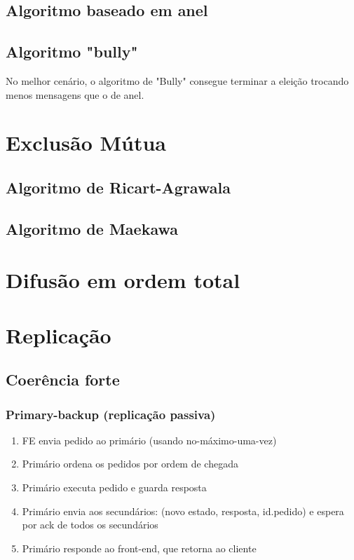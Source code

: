 \documentclass[12pt]{article}
\begin{document}
\subsection{Algoritmo baseado em anel}



\subsection{Algoritmo "bully"}



No melhor cenário, o algoritmo de "Bully" consegue terminar a eleição trocando menos mensagens que o de anel.

\section{Exclusão Mútua}

\subsection{Algoritmo de Ricart-Agrawala}

\subsection{Algoritmo de Maekawa}

\newpage

\section{Difusão em ordem total}

\newpage

\section{Replicação}

\subsection{Coerência forte}

\subsubsection{Primary-backup (replicação passiva)}

\begin{enumerate}
    \item FE envia pedido ao primário (usando no-máximo-uma-vez)
    \item Primário ordena os pedidos por ordem de chegada
    \item Primário executa pedido e guarda resposta
    \item Primário envia aos secundários: (novo estado, resposta, id.pedido) e  espera por ack de todos os secundários
    \item Primário responde ao front-end, que retorna ao cliente
\end{enumerate}
\end{document}
